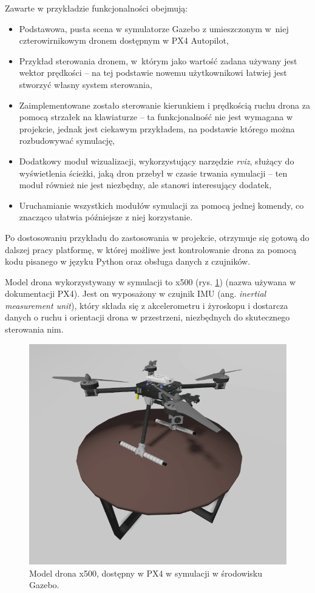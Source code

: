 Zawarte w przykładzie funkcjonalności obejmują:
\begin{itemize}
    \item Podstawowa, pusta scena w symulatorze Gazebo z umieszczonym w~niej czterowirnikowym dronem dostępnym w PX4 Autopilot,
    \item Przykład sterowania dronem, w~którym jako wartość zadana używany jest wektor prędkości -- na tej podstawie nowemu użytkownikowi łatwiej jest stworzyć własny system sterowania,
    \item Zaimplementowane zostało sterowanie kierunkiem i prędkością ruchu drona za pomocą strzałek na klawiaturze -- ta funkcjonalność nie jest wymagana w projekcie, jednak jest ciekawym przykładem, na podstawie którego można rozbudowywać symulację,
    \item Dodatkowy moduł wizualizacji, wykorzystujący narzędzie \textit{rviz}, służący do wyświetlenia ścieżki, jaką dron przebył w czasie trwania symulacji -- ten moduł również nie jest niezbędny, ale stanowi interesujący dodatek,
    \item Uruchamianie wszystkich modułów symulacji za pomocą jednej komendy, co znacząco ułatwia późniejsze z niej korzystanie.
\end{itemize}

Po dostosowaniu przykładu do zastosowania w projekcie, otrzymuje się gotową do dalszej pracy platformę, w której możliwe jest kontrolowanie drona za pomocą kodu pisanego w języku Python oraz obsługa danych z czujników.

Model drona wykorzystywany w symulacji to x500 (rys. \ref{fig:x500}) (nazwa używana w dokumentacji PX4). Jest on wyposażony w czujnik IMU (ang. \textit{inertial measurement unit}), który składa się z akcelerometru i żyroskopu i dostarcza danych o ruchu i orientacji drona w przestrzeni, niezbędnych do skutecznego sterowania nim.


\begin{figure}
    \centering
    \includegraphics[width=0.5\linewidth]{images/x500.png}
    \caption{Model drona x500, dostępny w PX4 w symulacji w środowisku Gazebo.}
    \label{fig:x500}
\end{figure}

